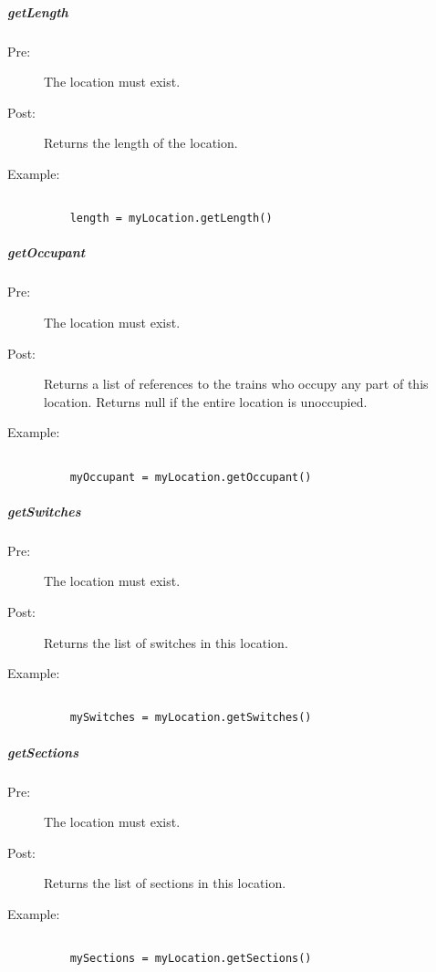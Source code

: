 \documentclass[a4paper,11pt,notitlepage]{article}
\begin{document}
\subparagraph{getLength}
\begin{description}
\item[\hspace{1cm}Pre:] The location must exist.
\item[\hspace{1cm}Post:] Returns the length of the location.
\item[\hspace{1cm}Example:]
\begin{verbatim}

    length = myLocation.getLength()
\end{verbatim}
\end{description}

\subparagraph{getOccupant}
\begin{description}
\item[\hspace{1cm}Pre:] The location must exist.
\item[\hspace{1cm}Post:] Returns a list of references to the trains who occupy any part of this location. Returns null if the entire location is unoccupied.
\item[\hspace{1cm}Example:]
\begin{verbatim}

    myOccupant = myLocation.getOccupant()
\end{verbatim}
\end{description}

\subparagraph{getSwitches}
\begin{description}
\item[\hspace{1cm}Pre:] The location must exist.
\item[\hspace{1cm}Post:] Returns the list of switches in this location.
\item[\hspace{1cm}Example:]
\begin{verbatim}

    mySwitches = myLocation.getSwitches()
\end{verbatim}
\end{description}

\subparagraph{getSections}
\begin{description}
\item[\hspace{1cm}Pre:] The location must exist.
\item[\hspace{1cm}Post:] Returns the list of sections in this location.
\item[\hspace{1cm}Example:]
\begin{verbatim}

    mySections = myLocation.getSections()
\end{verbatim}
\end{description}
\end{document}
